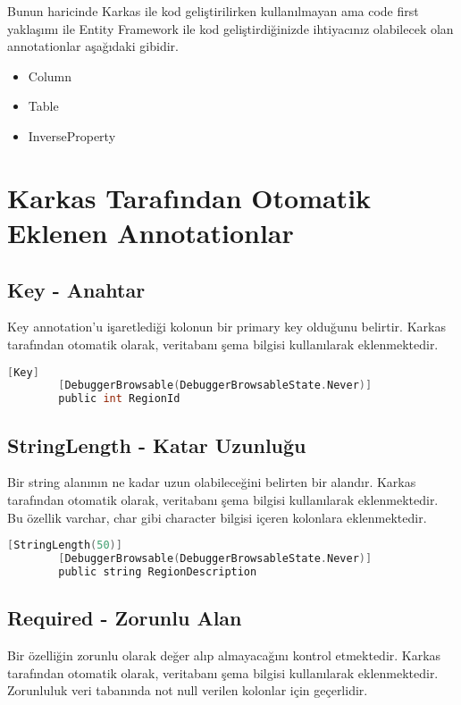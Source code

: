 \documentclass[10pt,a4paper]{article}
\begin{document}
Bunun haricinde Karkas ile kod geliştirilirken kullanılmayan
ama code first yaklaşımı ile Entity Framework ile kod
geliştirdiğinizde ihtiyacınız olabilecek olan
annotationlar aşağıdaki gibidir.


\begin{itemize}

\item  Column

\item Table

\item InverseProperty
\end{itemize}


\section{Karkas Tarafından Otomatik Eklenen Annotationlar}

\subsection{Key - Anahtar}
Key annotation'u işaretlediği kolonun bir primary key olduğunu belirtir.
Karkas tarafından otomatik olarak, veritabanı şema bilgisi kullanılarak eklenmektedir.

\begin{lstlisting}[label=code-Key,caption=Key,language=C]
		[Key]
		[DebuggerBrowsable(DebuggerBrowsableState.Never)]
		public int RegionId
\end{lstlisting}


\subsection{StringLength - Katar Uzunluğu}
Bir string alanının ne kadar uzun olabileceğini belirten bir alandır.
Karkas tarafından otomatik olarak, veritabanı şema bilgisi kullanılarak eklenmektedir.
Bu özellik varchar, char gibi character bilgisi içeren kolonlara eklenmektedir.

\begin{lstlisting}[label=code-StringLength,caption=StringLength,language=C]
		[StringLength(50)]
		[DebuggerBrowsable(DebuggerBrowsableState.Never)]
		public string RegionDescription
\end{lstlisting}



\subsection{Required - Zorunlu Alan}
Bir özelliğin zorunlu olarak değer alıp almayacağını kontrol etmektedir.
Karkas tarafından otomatik olarak, veritabanı şema bilgisi kullanılarak eklenmektedir.
Zorunluluk veri tabanında not null verilen kolonlar için geçerlidir.
\end{document}
